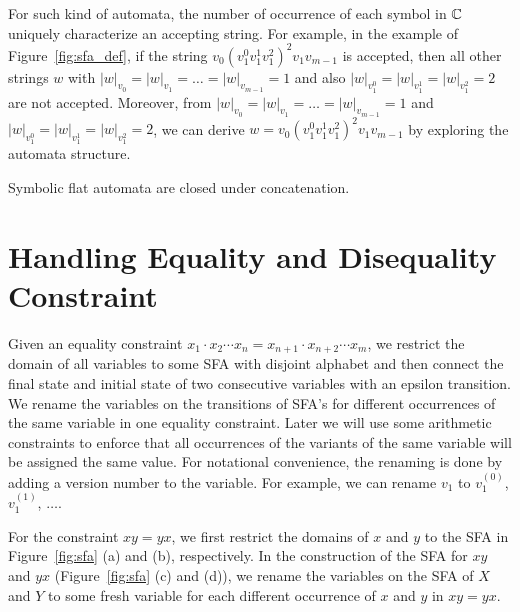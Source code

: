 \documentclass{llncs}
\begin{document}
For such kind of automata, the number of occurrence of each symbol in $\mbox{$\mathbb{C}$}$ uniquely characterize an accepting string. For example, in the example of Figure~\ref{fig:sfa_def}, if the string $v_0(v^0_1v^1_1v^2_1)^2v_1v_{m-1}$ is accepted, then all other strings $w$ with $|w|_{v_0}=|w|_{v_1}=\ldots=|w|_{v_{m-1}}=1$ and also $|w|_{v^0_1}=|w|_{v^1_1}=|w|_{v^2_1}=2$ are not accepted. Moreover, from $|w|_{v_0}=|w|_{v_1}=\ldots=|w|_{v_{m-1}}=1$ and $|w|_{v^0_1}=|w|_{v^1_1}=|w|_{v^2_1}=2$, we can derive $w=v_0(v^0_1v^1_1v^2_1)^2v_1v_{m-1}$ by exploring the automata structure. 

\begin{lemma}
	Symbolic flat automata are closed under concatenation.
\end{lemma}






\section{Handling Equality and Disequality Constraint} \label{section:eq}
Given an equality constraint $x_1\cdot x_2 \cdots x_n = x_{n+1}\cdot x_{n+2} \cdots x_m$, we restrict the domain of all variables to some SFA with disjoint alphabet and then connect the final state and initial state of two consecutive variables with an epsilon transition. We rename the variables on the transitions of SFA's for different occurrences of the same variable in one equality constraint. Later we will use some arithmetic constraints to enforce that all occurrences of the variants of the same variable will be assigned the same value. For notational convenience, the renaming is done by adding a version number to the variable. For example, we can rename $v_1$ to $v_1^{(0)}$, $v_1^{(1)}$, $\ldots$.

For the constraint $xy = yx$, we first restrict the domains of $x$ and $y$ to the SFA in Figure~\ref{fig:sfa} (a) and (b), respectively. In the construction of the SFA for $xy$ and $yx$ (Figure~\ref{fig:sfa} (c) and (d)), we rename the variables on the SFA of $X$ and $Y$ to some fresh variable for each different occurrence of $x$ and $y$ in $xy = yx$.
\end{document}
